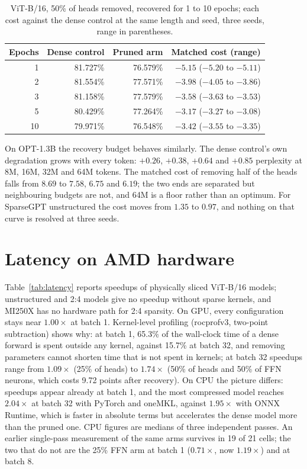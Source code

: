 \documentclass[11pt,a4paper]{article}
\begin{document}
\begin{table}[t]
\centering
\caption{ViT-B/16, 50\% of heads removed, recovered for 1 to 10 epochs; each cost against the dense control at the same length and seed, three seeds, range in parentheses.}
\label{tab:ladder}
\begin{tabular}{rrrr}
\toprule
Epochs & Dense control & Pruned arm & Matched cost (range) \\
\midrule
1 & 81.727\% & 76.579\% & $-5.15$ ($-5.20$ to $-5.11$) \\
2 & 81.554\% & 77.571\% & $-3.98$ ($-4.05$ to $-3.86$) \\
3 & 81.158\% & 77.579\% & $-3.58$ ($-3.63$ to $-3.53$) \\
5 & 80.429\% & 77.264\% & $-3.17$ ($-3.27$ to $-3.08$) \\
10 & 79.971\% & 76.548\% & $-3.42$ ($-3.55$ to $-3.35$) \\
\bottomrule
\end{tabular}
\end{table}

On OPT-1.3B the recovery budget behaves similarly. The dense control's own degradation grows with every token: $+0.26$, $+0.38$, $+0.64$ and $+0.85$ perplexity at 8M, 16M, 32M and 64M tokens. The matched cost of removing half of the heads falls from $8.69$ to $7.58$, $6.75$ and $6.19$; the two ends are separated but neighbouring budgets are not, and 64M is a floor rather than an optimum. For SparseGPT unstructured the cost moves from $1.35$ to $0.97$, and nothing on that curve is resolved at three seeds.

\section{Latency on AMD hardware}
\label{sec:latency}

Table~\ref{tab:latency} reports speedups of physically sliced ViT-B/16 models; unstructured and 2:4 models give no speedup without sparse kernels, and MI250X has no hardware path for 2:4 sparsity. On GPU, every configuration stays near $1.00\times$ at batch 1. Kernel-level profiling (rocprofv3, two-point subtraction) shows why: at batch 1, 65.3\% of the wall-clock time of a dense forward is spent outside any kernel, against 15.7\% at batch 32, and removing parameters cannot shorten time that is not spent in kernels; at batch 32 speedups range from $1.09\times$ (25\% of heads) to $1.74\times$ (50\% of heads and 50\% of FFN neurons, which costs 9.72 points after recovery). On CPU the picture differs: speedups appear already at batch 1, and the most compressed model reaches $2.04\times$ at batch 32 with PyTorch and oneMKL, against $1.95\times$ with ONNX Runtime, which is faster in absolute terms but accelerates the dense model more than the pruned one. CPU figures are medians of three independent passes. An earlier single-pass measurement of the same arms survives in 19 of 21 cells; the two that do not are the 25\% FFN arm at batch 1 ($0.71\times$, now $1.19\times$) and at batch 8.
\end{document}
